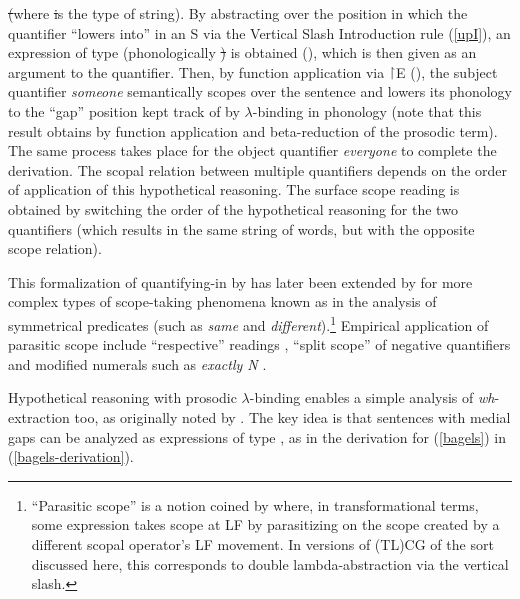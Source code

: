 \documentclass[output=paper
                ,modfonts
                ,nonflat
	        ,collection
	        ,collectionchapter
	        ,collectiontoclongg
 	        ,biblatex
                ,babelshorthands
                ,newtxmath
                ,draftmode
                ,colorlinks, citecolor=brown
]{./langsci/langscibook}
\begin{document}
\st\xspace (where \st\xspace is the type of string).
By abstracting over the position in which the quantifier
``lowers into'' in an S via the Vertical Slash Introduction rule (\ref{upI}),
an expression of
type  (phonologically \st\xspace \shortarrow
\st\xspace)  is obtained (),
which is then given as an argument to the quantifier. Then, by function
application via $\vs$E (), the subject quantifier \textit{someone}
semantically scopes over the sentence and lowers its phonology to the
``gap'' position kept track of by $\lambda$-binding in phonology (note
that this result obtains by function application and beta-reduction of
the prosodic term). The same
process takes place for the object quantifier \textit{everyone} to complete
the derivation.  The scopal
relation between multiple quantifiers depends on the order of
application of this hypothetical reasoning.
The surface scope reading is obtained by switching the order of the 
hypothetical reasoning for the two quantifiers (which results in the
same string of words, but with the opposite scope relation).

This formalization of quantifying-in by \citet{oehrle1994} has later
been extended by \citet{barker07} for more complex types of
scope-taking phenomena known as  in the analysis
of symmetrical predicates (such as \textit{same} and
\textit{different}).\footnote{``Parasitic scope'' is a notion coined by
\citet{barker07} where, in transformational terms, some expression
takes scope at LF by parasitizing on the scope created by a different
scopal operator's LF movement. In versions of (TL)CG of the sort
discussed here, this corresponds to double lambda-abstraction via the
vertical slash.}
Empirical application of parasitic scope include ``respective'' readings
\citep{kubota-levine-resp},  
``split scope'' of negative quantifiers
\citep{kubota-levine-gapping} and modified numerals such as \textit{exactly N}
\citep{pollard-numerical}.

Hypothetical reasoning with prosodic $\lambda$-binding enables a simple
analysis of \textit{wh}-extraction too, as originally noted by \citet{muskens03}.
The key idea is that sentences with medial gaps can be analyzed
as expressions  of type , as in the derivation for
(\ref{bagels}) in (\ref{bagels-derivation}).
\end{document}
